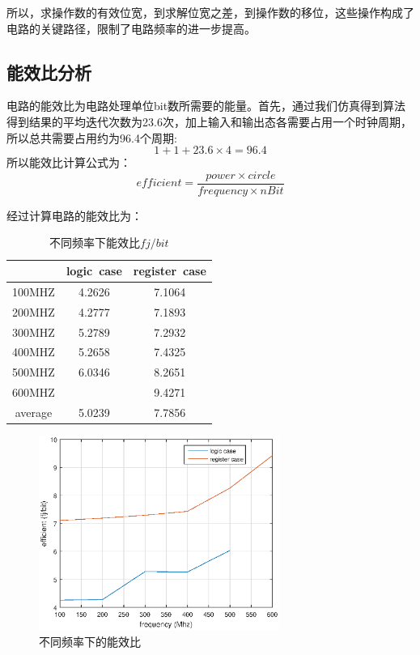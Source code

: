 \documentclass[12pt]{article}
\begin{document}
所以，求操作数的有效位宽，到求解位宽之差，到操作数的移位，这些操作构成了电路的关键路径，限制了电路频率的进一步提高。
\subsection{能效比分析}
电路的能效比为电路处理单位bit数所需要的能量。首先，通过我们仿真得到算法得到结果的平均迭代次数为23.6次，加上输入和输出态各需要占用一个时钟周期，所以总共需要占用约为96.4个周期:
$$1 + 1 + 23.6 \times 4 = 96.4$$
所以能效比计算公式为：
$$efficient = \frac{power \times circle}{frequency \times nBit}$$

经过计算电路的能效比为：

\begin{table}[H]
\centering
\begin{tabular}{ccc}
\hline 
& logic~case & register~case\\
\hline 
100MHZ & 4.2626& 7.1064\\
200MHZ & 4.2777& 7.1893\\
300MHZ & 5.2789& 7.2932\\
400MHZ & 5.2658& 7.4325\\
500MHZ & 6.0346& 8.2651\\
600MHZ &  & 9.4271\\
average & 5.0239 & 7.7856\\
\hline 
\end{tabular}
\caption{不同频率下能效比$fj/bit$}
\label{area_table}

\end{table}

\begin{figure}[H]
\begin{center}
\includegraphics[width=0.7\textwidth]{./powerandarea/efficient.eps}
\caption{不同频率下的能效比}
\label{efficient_model}
\end{center}
\end{figure}
\end{document}
